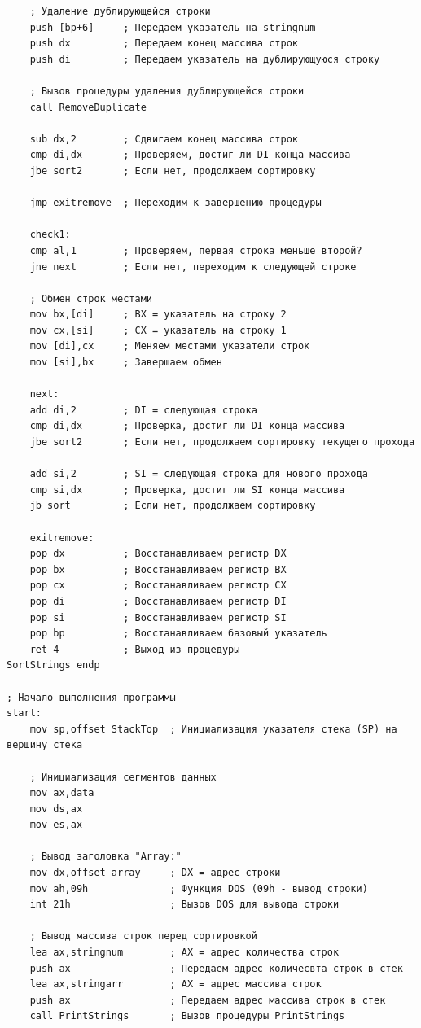 \documentclass[a4paper,14pt]{article}
\begin{document}
\begin{lstlisting}
    ; Удаление дублирующейся строки
    push [bp+6]     ; Передаем указатель на stringnum
    push dx         ; Передаем конец массива строк
    push di         ; Передаем указатель на дублирующуюся строку

    ; Вызов процедуры удаления дублирующейся строки
    call RemoveDuplicate

    sub dx,2        ; Сдвигаем конец массива строк
    cmp di,dx       ; Проверяем, достиг ли DI конца массива
    jbe sort2       ; Если нет, продолжаем сортировку

    jmp exitremove  ; Переходим к завершению процедуры

    check1:
    cmp al,1        ; Проверяем, первая строка меньше второй?	
    jne next        ; Если нет, переходим к следующей строке

    ; Обмен строк местами
    mov bx,[di]     ; BX = указатель на строку 2
    mov cx,[si]     ; CX = указатель на строку 1
    mov [di],cx     ; Меняем местами указатели строк
    mov [si],bx     ; Завершаем обмен

    next:
    add di,2        ; DI = следующая строка
    cmp di,dx       ; Проверка, достиг ли DI конца массива
    jbe sort2       ; Если нет, продолжаем сортировку текущего прохода

    add si,2        ; SI = следующая строка для нового прохода
    cmp si,dx       ; Проверка, достиг ли SI конца массива
    jb sort         ; Если нет, продолжаем сортировку

    exitremove:
    pop dx          ; Восстанавливаем регистр DX
    pop bx          ; Восстанавливаем регистр BX
    pop cx          ; Восстанавливаем регистр CX
    pop di          ; Восстанавливаем регистр DI
    pop si          ; Восстанавливаем регистр SI
    pop bp          ; Восстанавливаем базовый указатель
    ret 4           ; Выход из процедуры
SortStrings endp

; Начало выполнения программы
start: 
    mov sp,offset StackTop  ; Инициализация указателя стека (SP) на вершину стека

    ; Инициализация сегментов данных
    mov ax,data             
    mov ds,ax		
    mov es,ax		

    ; Вывод заголовка "Array:"
    mov dx,offset array     ; DX = адрес строки
    mov ah,09h              ; Функция DOS (09h - вывод строки)
    int 21h                 ; Вызов DOS для вывода строки

    ; Вывод массива строк перед сортировкой
    lea ax,stringnum        ; AX = адрес количества строк
    push ax                 ; Передаем адрес количесвта строк в стек
    lea ax,stringarr        ; AX = адрес массива строк
    push ax                 ; Передаем адрес массива строк в стек
    call PrintStrings       ; Вызов процедуры PrintStrings


\end{lstlisting}
\end{document}
